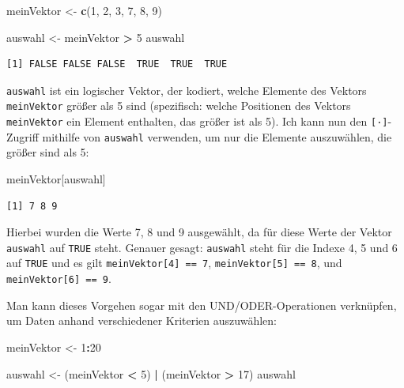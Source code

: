 \documentclass[12pt,]{tufte-book}
\newenvironment{Shaded}{\begin{snugshade}}{\end{snugshade}}
\newcommand{\KeywordTok}[1]{\textcolor[rgb]{0.13,0.29,0.53}{\textbf{#1}}}
\newcommand{\DecValTok}[1]{\textcolor[rgb]{0.00,0.00,0.81}{#1}}
\newcommand{\StringTok}[1]{\textcolor[rgb]{0.31,0.60,0.02}{#1}}
\newcommand{\OperatorTok}[1]{\textcolor[rgb]{0.81,0.36,0.00}{\textbf{#1}}}
\newcommand{\NormalTok}[1]{#1}
\theoremstyle{definition}
\theoremstyle{definition}
\theoremstyle{definition}
\theoremstyle{remark}
\begin{document}
\begin{Shaded}
\begin{Highlighting}[]
\NormalTok{meinVektor <-}\StringTok{ }\KeywordTok{c}\NormalTok{(}\DecValTok{1}\NormalTok{, }\DecValTok{2}\NormalTok{, }\DecValTok{3}\NormalTok{, }\DecValTok{7}\NormalTok{, }\DecValTok{8}\NormalTok{, }\DecValTok{9}\NormalTok{)}

\NormalTok{auswahl <-}\StringTok{ }\NormalTok{meinVektor }\OperatorTok{>}\StringTok{ }\DecValTok{5}
\NormalTok{auswahl}
\end{Highlighting}
\end{Shaded}

\begin{verbatim}
[1] FALSE FALSE FALSE  TRUE  TRUE  TRUE
\end{verbatim}

\texttt{auswahl} ist ein logischer Vektor, der kodiert, welche Elemente
des Vektors \texttt{meinVektor} größer als 5 sind (spezifisch: welche
Positionen des Vektors \texttt{meinVektor} ein Element enthalten, das
größer ist als 5). Ich kann nun den \texttt{{[}·{]}}-Zugriff mithilfe
von \texttt{auswahl} verwenden, um nur die Elemente auszuwählen, die
größer sind als 5:

\begin{Shaded}
\begin{Highlighting}[]
\NormalTok{meinVektor[auswahl]}
\end{Highlighting}
\end{Shaded}

\begin{verbatim}
[1] 7 8 9
\end{verbatim}

Hierbei wurden die Werte 7, 8 und 9 ausgewählt, da für diese Werte der
Vektor \texttt{auswahl} auf \texttt{TRUE} steht. Genauer gesagt:
\texttt{auswahl} steht für die Indexe 4, 5 und 6 auf \texttt{TRUE} und
es gilt \texttt{meinVektor{[}4{]}\ ==\ 7},
\texttt{meinVektor{[}5{]}\ ==\ 8}, und
\texttt{meinVektor{[}6{]}\ ==\ 9}.

Man kann dieses Vorgehen sogar mit den UND/ODER-Operationen verknüpfen,
um Daten anhand verschiedener Kriterien auszuwählen:

\begin{Shaded}
\begin{Highlighting}[]
\NormalTok{meinVektor <-}\StringTok{ }\DecValTok{1}\OperatorTok{:}\DecValTok{20}

\NormalTok{auswahl <-}\StringTok{ }\NormalTok{(meinVektor }\OperatorTok{<}\StringTok{ }\DecValTok{5}\NormalTok{) }\OperatorTok{|}\StringTok{ }\NormalTok{(meinVektor }\OperatorTok{>}\StringTok{ }\DecValTok{17}\NormalTok{)}
\NormalTok{auswahl}
\end{Highlighting}
\end{Shaded}
\end{document}
